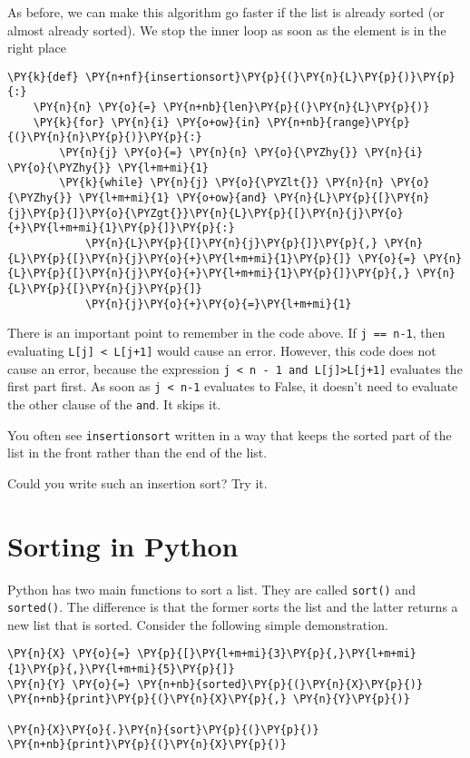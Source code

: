 As before, we can make this algorithm go faster if the list is already sorted (or almost already sorted).  We stop the inner loop as soon as the element is in the right place

\begin{Verbatim}[commandchars=\\\{\}]
\PY{k}{def} \PY{n+nf}{insertionsort}\PY{p}{(}\PY{n}{L}\PY{p}{)}\PY{p}{:}
    \PY{n}{n} \PY{o}{=} \PY{n+nb}{len}\PY{p}{(}\PY{n}{L}\PY{p}{)}
    \PY{k}{for} \PY{n}{i} \PY{o+ow}{in} \PY{n+nb}{range}\PY{p}{(}\PY{n}{n}\PY{p}{)}\PY{p}{:}
        \PY{n}{j} \PY{o}{=} \PY{n}{n} \PY{o}{\PYZhy{}} \PY{n}{i} \PY{o}{\PYZhy{}} \PY{l+m+mi}{1}
        \PY{k}{while} \PY{n}{j} \PY{o}{\PYZlt{}} \PY{n}{n} \PY{o}{\PYZhy{}} \PY{l+m+mi}{1} \PY{o+ow}{and} \PY{n}{L}\PY{p}{[}\PY{n}{j}\PY{p}{]}\PY{o}{\PYZgt{}}\PY{n}{L}\PY{p}{[}\PY{n}{j}\PY{o}{+}\PY{l+m+mi}{1}\PY{p}{]}\PY{p}{:}
            \PY{n}{L}\PY{p}{[}\PY{n}{j}\PY{p}{]}\PY{p}{,} \PY{n}{L}\PY{p}{[}\PY{n}{j}\PY{o}{+}\PY{l+m+mi}{1}\PY{p}{]} \PY{o}{=} \PY{n}{L}\PY{p}{[}\PY{n}{j}\PY{o}{+}\PY{l+m+mi}{1}\PY{p}{]}\PY{p}{,} \PY{n}{L}\PY{p}{[}\PY{n}{j}\PY{p}{]}
            \PY{n}{j}\PY{o}{+}\PY{o}{=}\PY{l+m+mi}{1}
\end{Verbatim}



There is an important point to remember in the code above.  If \texttt{j == n-1}, then evaluating \texttt{L[j] < L[j+1]} would cause an error.  However, this code does not cause an error, because the expression \texttt{j < n - 1 and L[j]>L[j+1]} evaluates the first part first.  As soon as \texttt{j < n-1} evaluates to False, it doesn't need to evaluate the other clause of the \texttt{and}.  It skips it.


You often see \texttt{insertionsort} written in a way that keeps the sorted part of the list in the front rather than the end of the list.  


Could you write such an insertion sort?  Try it.

\section{Sorting in Python}


Python has two main functions to sort a list.  They are called \texttt{sort()} and \texttt{sorted()}.  The difference is that the former sorts the list and the latter returns a new list that is sorted.  Consider the following simple demonstration.

\begin{Verbatim}[commandchars=\\\{\}]
\PY{n}{X} \PY{o}{=} \PY{p}{[}\PY{l+m+mi}{3}\PY{p}{,}\PY{l+m+mi}{1}\PY{p}{,}\PY{l+m+mi}{5}\PY{p}{]}
\PY{n}{Y} \PY{o}{=} \PY{n+nb}{sorted}\PY{p}{(}\PY{n}{X}\PY{p}{)}
\PY{n+nb}{print}\PY{p}{(}\PY{n}{X}\PY{p}{,} \PY{n}{Y}\PY{p}{)}

\PY{n}{X}\PY{o}{.}\PY{n}{sort}\PY{p}{(}\PY{p}{)}
\PY{n+nb}{print}\PY{p}{(}\PY{n}{X}\PY{p}{)}
\end{Verbatim}


